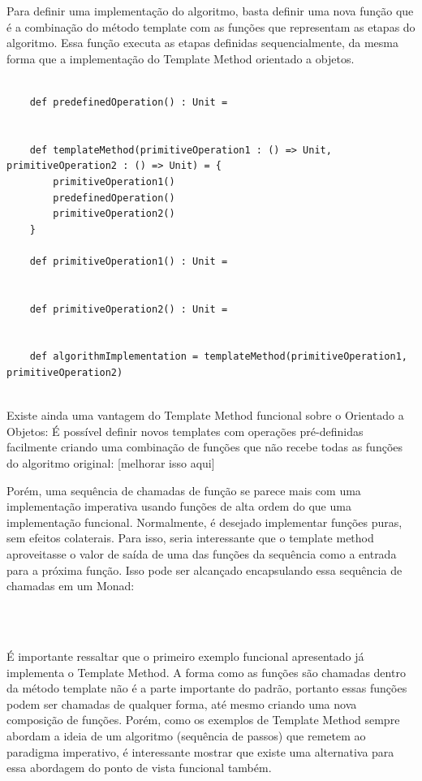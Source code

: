 Para definir uma implementação do algoritmo, basta definir uma nova função 
que é a combinação do método template com as funções que representam as 
etapas do algoritmo. Essa função executa as etapas definidas sequencialmente, 
da mesma forma que a implementação do Template Method orientado a objetos.


\begin{lstlisting}[caption={Template Method Funcional},label=fptpmethod]
    
    def predefinedOperation() : Unit =
        

    def templateMethod(primitiveOperation1 : () => Unit, primitiveOperation2 : () => Unit) = {
        primitiveOperation1()
        predefinedOperation()
        primitiveOperation2()
    }

    def primitiveOperation1() : Unit = 
        

    def primitiveOperation2() : Unit = 
        
    
    def algorithmImplementation = templateMethod(primitiveOperation1, primitiveOperation2)


\end{lstlisting}

Existe ainda uma vantagem do Template Method funcional sobre o Orientado a 
Objetos: É possível definir novos templates com operações pré-definidas 
facilmente criando uma combinação de funções que não recebe todas as 
funções do algoritmo original: [melhorar isso aqui]

Porém, uma sequência de chamadas de função se parece mais com uma 
implementação imperativa usando funções de alta ordem do que uma implementação 
funcional. Normalmente, é desejado implementar funções puras, sem efeitos 
colaterais. Para isso, seria interessante que o template method aproveitasse 
o valor de saída de uma das funções da sequência como a entrada para a 
próxima função. Isso pode ser alcançado encapsulando essa sequência de 
chamadas em um Monad:

\begin{lstlisting}[caption={Template Method Funcional: Monads},label=fptpmethodmonads]
    
    

\end{lstlisting}

É importante ressaltar que o primeiro exemplo funcional apresentado 
já implementa o Template Method. A forma como as funções são chamadas 
dentro da método template não é a parte importante do padrão, portanto 
essas funções podem ser chamadas de qualquer forma, até mesmo criando 
uma nova composição de funções. Porém, como os exemplos de Template 
Method sempre abordam a ideia de um algoritmo (sequência de passos) que 
remetem ao paradigma imperativo, é interessante mostrar que existe uma 
alternativa para essa abordagem do ponto de vista funcional também.